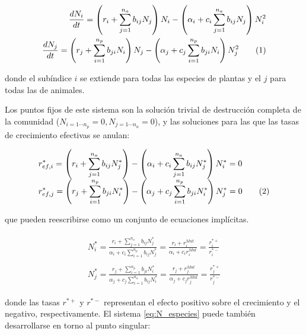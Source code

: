 \begin{align}
\frac{dN_{i}}{dt} = \left( r_{i}+ \sum_{j=1}^{n_{a}} b_{ij}N_{j}\right)N_{i} - \left(\alpha_{i}+ c_{i} \sum_{j=1}^{n_{a}} b_{ij}N_{j} \right) N^{2}_{i} \nonumber\\ 
\frac{dN_{j}}{dt} = \left( r_{j}+ \sum_{i=1}^{n_{p}} b_{ji}N_{i}\right)N_{j} - \left(\alpha_{j}+ c_{j} \sum_{i=1}^{n_{p}} b_{ji} N_{i} \right) N^{2}_{j} 
\stepcounter{equation}\tag{\theequation}\label{eq:N_especies}
\end{align}

\noindent donde el subíndice $i$ se extiende para todas las especies de plantas y el $j$ para todas las de animales.

Los puntos fijos de este sistema son la solución trivial de destrucción completa de la comunidad ($N_{i=1\cdots n_{p}}=0, N_{j=1\cdots n_{a}}=0$), y las soluciones para las que las tasas de crecimiento efectivas se anulan: 

\begin{equation}
\begin{array}{lcr}
\displaystyle r^{*}_{ef,i} =\left(r_{i}+ \sum_{j=1}^{n_{a}} b_{ij}N^{*}_{j}\right)- \left(\alpha_{i}+c_{i}\sum_{j=1}^{n_{a}} b_{ij}N^{*}_j\right)N^{*}_{i}
=0 \nonumber\\
\displaystyle r^{*}_{ef,j} = \left(r_{j}+ \sum_{i=1}^{n_{p}} b_{ji}N^{*}_{i}\right)- \left(\alpha_{j}+c_{j}\sum_{i=1}^{n_{p}} b_{ji}N^{*}_i\right)N^{*}_{j} 
=0 
\stepcounter{equation}\tag{\theequation}\label{eq:effrateN}
\end{array}
\end{equation}

\noindent que pueden reescribirse como un conjunto de ecuaciones implícitas.

\begin{eqnarray}
\begin{array}{lcc}
  N^{*}_{i}=\frac{r_{i}+\sum_{j=1}^{n_{a}}b_{ij}N^{*}_{j}}{\alpha_{i}+c_{i}\sum_{i=1}^{n_{p}}b_{ij}N^{*}_{j}} = 
  \frac{r_{i}+r_{i}^{Mut}}{\alpha_{i}+c_{i}r_{i}^{Mut}} = 
  \frac{r_{i}^{*+}}{r_{i}^{*-}}  \nonumber\\
  \\
  N^{*}_{j}=\frac{r_{j}+\sum_{i=1}^{n_{p}}b_{ji}N^{*}_{i}}{\alpha_{j}+c_{j}\sum_{i=1}^{n_{a}}b_{ij}N^{*}_{i}} =
  \frac{r_{j}+r_{j}^{Mut}}{\alpha_{j}+c_{j}r_{j}^{Mut}} =
  \frac{r_{j}^{*+}}{r_{j}^{*-}}
  \end{array}
\end{eqnarray} 
 
\noindent donde las tasas $r^{*+}$ y $r^{*-}$ representan el efecto positivo sobre el crecimiento y el negativo, respectivamente. El sistema \ref{eq:N_especies} puede también desarrollarse en torno al punto singular:

